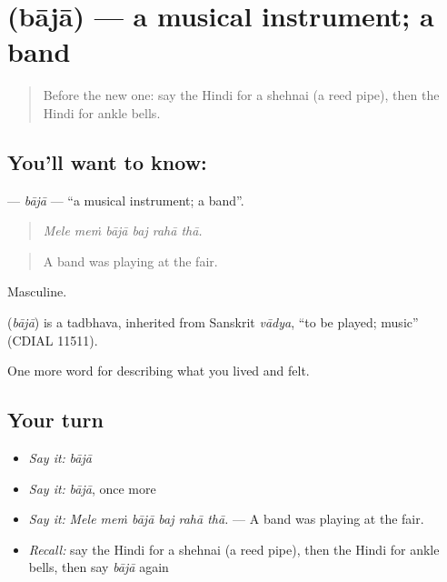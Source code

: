 \section[\texorpdfstring{\hi{बाजा} (bājā)}{बाजा (bājā)}]{ (bājā) — a musical instrument; a band}

\label{lesson:HI-C531-baja}



\begin{quote}
Before the new one: say the Hindi for a shehnai (a reed pipe), then the Hindi for ankle bells.
\end{quote}

\subsection*{You'll want to know: }
\textbf{} — \emph{bājā} — \textquotedblleft{}a musical instrument; a band\textquotedblright{}.

\begin{quote}
     
\end{quote}

\begin{quote}
\emph{Mele meṁ bājā baj rahā thā.}
\end{quote}

\begin{quote}
A band was playing at the fair.
\end{quote}

Masculine.

\begin{cousinweb}
\textbf{} (\emph{bājā}) is a tadbhava, inherited from Sanskrit \emph{vādya}, \textquotedblleft{}to be played; music\textquotedblright{} (CDIAL 11511).
\end{cousinweb}

\begin{grammarlens}[title={What you've built}]
One more word for describing what you lived and felt.
\end{grammarlens}

\subsection*{Your turn}
\begin{itemize}
\raggedright
  \item \emph{Say it:} \emph{bājā}
  \item \emph{Say it:} \emph{bājā}, once more
  \item \emph{Say it:} \emph{Mele meṁ bājā baj rahā thā.} — A band was playing at the fair.
  \item \emph{Recall:} say the Hindi for a shehnai (a reed pipe), then the Hindi for ankle bells, then say \emph{bājā} again
\end{itemize}

